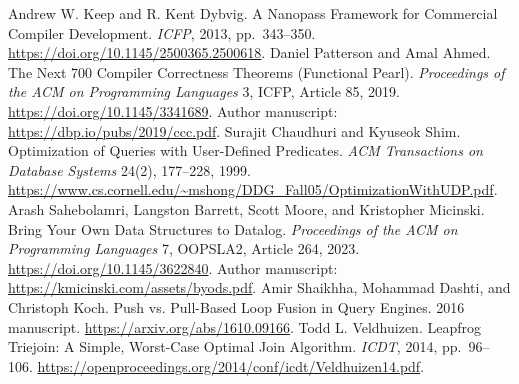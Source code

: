  Andrew W. Keep and R. Kent Dybvig.
A Nanopass Framework for Commercial Compiler Development.
\emph{ICFP}, 2013, pp.~343--350.
\url{https://doi.org/10.1145/2500365.2500618}.
 Daniel Patterson and Amal Ahmed.
The Next 700 Compiler Correctness Theorems (Functional Pearl).
\emph{Proceedings of the ACM on Programming Languages} 3, ICFP,
Article 85, 2019.
\url{https://doi.org/10.1145/3341689}.
Author manuscript: \url{https://dbp.io/pubs/2019/ccc.pdf}.
 Surajit Chaudhuri and Kyuseok Shim.
Optimization of Queries with User-Defined Predicates.
\emph{ACM Transactions on Database Systems} 24(2), 177--228, 1999.
\url{https://www.cs.cornell.edu/~mshong/DDG_Fall05/OptimizationWithUDP.pdf}.
 Arash Sahebolamri, Langston Barrett, Scott Moore,
and Kristopher Micinski. Bring Your Own Data Structures to Datalog.
\emph{Proceedings of the ACM on Programming Languages} 7, OOPSLA2,
Article 264, 2023.
\url{https://doi.org/10.1145/3622840}.
Author manuscript: \url{https://kmicinski.com/assets/byods.pdf}.
 Amir Shaikhha, Mohammad Dashti, and Christoph Koch.
Push vs. Pull-Based Loop Fusion in Query Engines. 2016 manuscript.
\url{https://arxiv.org/abs/1610.09166}.
 Todd L. Veldhuizen.
Leapfrog Triejoin: A Simple, Worst-Case Optimal Join Algorithm.
\emph{ICDT}, 2014, pp.~96--106.
\url{https://openproceedings.org/2014/conf/icdt/Veldhuizen14.pdf}.
